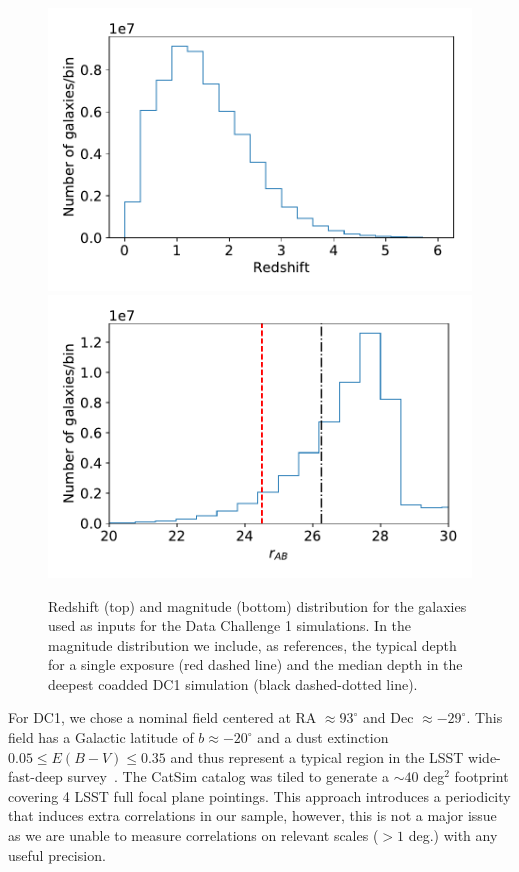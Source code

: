 \documentclass[\docopts]{\docclass}
\begin{document}
\begin{figure}
\centering
\includegraphics[width=0.9\columnwidth]{N_z_DC1.pdf}
\includegraphics[width=0.9\columnwidth]{N_m_DC1.pdf}
\caption{Redshift (top) and magnitude (bottom) distribution for the galaxies used as inputs for the Data Challenge 1 simulations. In the magnitude distribution we include, as references, the typical depth for a single exposure (red dashed line) and the median depth in the deepest coadded DC1 simulation (black dashed-dotted line).}
\label{fig:catalog_plots}
\end{figure}


For DC1, we chose a nominal field centered at RA $\approx 93^{\circ}$ and Dec $\approx -29^{\circ}$. This field has a Galactic latitude of $b \approx -20^{\circ}$ and a dust extinction $0.05 \leq E(B-V) \leq 0.35$ and thus represent a typical region in the LSST wide-fast-deep survey~\citep{Overview}. The CatSim catalog was tiled to generate a $\sim 40$ deg$^{2}$ footprint covering 4 LSST full focal plane pointings. This approach introduces a periodicity that induces extra correlations in our sample, however, this is not a major issue as we are unable to measure correlations on relevant scales ($> 1$ deg.) with any useful precision.
\end{document}
